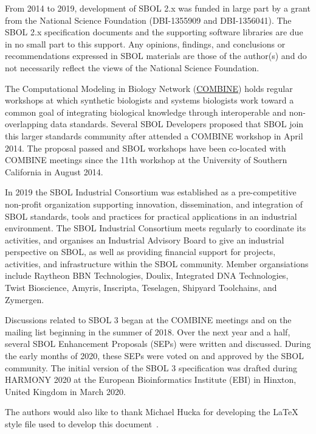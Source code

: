 From 2014 to 2019, development of SBOL 2.x was funded in large part by a grant from the National Science Foundation (DBI-1355909 and DBI-1356041).  The SBOL 2.x specification documents and the supporting software libraries are due in no small part to this support. Any opinions, findings, and conclusions or recommendations expressed in SBOL materials are those of the author(s) and do not necessarily reflect the views of the National Science Foundation.

The Computational Modeling in Biology Network (\href{www.co.mbine.org}{COMBINE}) holds regular workshops at which synthetic biologists and systems biologists work toward a common goal of integrating biological knowledge through interoperable and non-overlapping data standards. Several SBOL Developers proposed that SBOL join this larger standards community after attended a COMBINE workshop in April 2014.  The proposal passed and SBOL workshops have been co-located with COMBINE meetings since the 11th workshop at the University of Southern California in August 2014.

In 2019 the SBOL Industrial Consortium was established as a pre-competitive non-profit organization supporting innovation, dissemination, and integration of SBOL standards, tools and practices for practical applications in an industrial environment. The SBOL Industrial Consortium meets regularly to coordinate its activities, and organises an Industrial Advisory Board to give an industrial perspective on SBOL, as well as providing financial support for projects, activities, and infrastructure within the SBOL community.
Member organsiations include Raytheon BBN Technologies, Doulix, Integrated DNA Technologies, Twist Bioscience, Amyris, Inscripta, Teselagen, Shipyard Toolchains, and Zymergen.

Discussions related to SBOL 3 began at the COMBINE meetings and on the mailing list beginning in the summer of 2018.  Over the next year and a half, several SBOL Enhancement Proposals (SEPs) were written and discussed.  During the early months of 2020, these SEPs were voted on and approved by the SBOL community.  The initial version of the SBOL 3 specification was drafted during HARMONY 2020 at the European Bioinformatics Institute (EBI) in Hinxton, United Kingdom in March 2020.

The authors would also like to thank Michael Hucka for developing the LaTeX style file used to develop this document~\citep{hucka2017sbmlpkgspec}.

